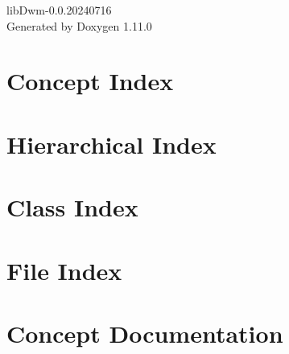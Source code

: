 \documentclass[twoside]{book}
\newcommand{\+}{\discretionary{\mbox{\scriptsize$\hookleftarrow$}}{}{}}
\newcommand{\clearemptydoublepage}{%
    \newpage{\pagestyle{empty}\cleardoublepage}%
  }
\begin{document}
  \raggedbottom
    \hypersetup{pageanchor=false,
                bookmarksnumbered=true,
                pdfencoding=unicode
               }
  \begin{titlepage}
  \vspace*{7cm}
  \begin{center}%
  {\Large lib\+Dwm-\/0.\+0.\+20240716}\\
  \vspace*{1cm}
  {\large Generated by Doxygen 1.11.0}\\
  \end{center}
  \end{titlepage}
  \clearemptydoublepage
  \tableofcontents
  \clearemptydoublepage
  \hypersetup{pageanchor=true}

\chapter{Concept Index}

\chapter{Hierarchical Index}

\chapter{Class Index}

\chapter{File Index}

\chapter{Concept Documentation}






\end{document}
